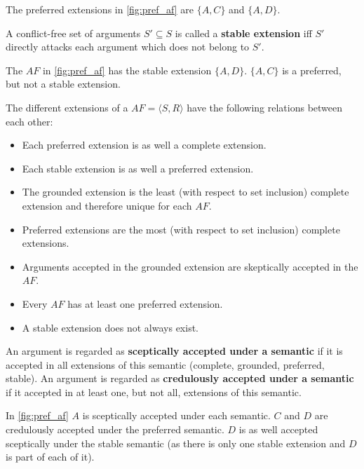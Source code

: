 \begin{exa}
The preferred extensions in \autoref{fig:pref_af} are $\{A, C\}$ and $\{A, D\}$.
\end{exa}

\begin{definition}
A conflict-free set of arguments $S' \subseteq S$ is called a \textbf{stable extension} iff $S'$ directly attacks each argument which does not belong to $S'$.
\end{definition}
\begin{exa}
The $AF$ in \autoref{fig:pref_af} has the stable extension $\{A, D\}$. $\{A, C\}$ is a preferred, but not a stable extension.
\end{exa}


\begin{remark}
The different extensions of a $AF = \langle S, R \rangle$ have the following relations between each other:

\begin{itemize} 
	\item Each preferred extension is as well a complete extension.
	\item Each stable extension is as well a preferred extension.
	\item The grounded extension is the least (with respect to set inclusion) complete extension and therefore unique for each $AF$.
	\item Preferred extensions are the most (with respect to set inclusion) complete extensions.
	\item Arguments accepted in the grounded extension are skeptically accepted in the $AF$.
	\item Every $AF$ has at least one preferred extension.
	\item A stable extension does not always exist.
\end{itemize}
\end{remark}

\begin{definition}
An argument is regarded as \textbf{sceptically accepted under a semantic} if it is accepted in all extensions of this semantic (complete, grounded, preferred, stable). An argument is regarded as \textbf{credulously accepted under a semantic} if it accepted in at least one, but not all, extensions of this semantic. 	
\end{definition}

\begin{exa}
In \autoref{fig:pref_af} $A$ is sceptically accepted under each semantic. $C$ and $D$ are credulously accepted under the preferred semantic. $D$ is as well accepted sceptically under the stable semantic (as there is only one stable extension and $D$ is part of each of it).
\end{exa}


